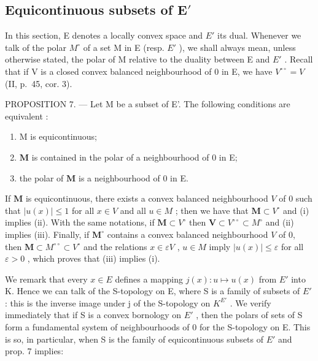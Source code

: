 \subsection{\texorpdfstring{Equicontinuous subsets of \(\mathbf{E}'\)}{Equicontinuous subsets of \textbackslash mathbf\{E\}\textquotesingle{}}}

In this section, E denotes a locally convex space and \(E'\) its dual. Whenever we talk of the polar \(M^{\circ}\) of a set M in E (resp. \(E'\) ), we shall always mean, unless otherwise stated, the polar of M relative to the duality between E and \(E'\) . Recall that if V is a closed convex balanced neighbourhood of 0 in E, we have \(V^{\circ\circ}=V\) (II, p.~45, cor. 3).

PROPOSITION 7. --- Let M be a subset of E'. The following conditions are equivalent :

\begin{enumerate}
\def\labelenumi{(\roman{enumi})}
\item
  M is equicontinuous;
\item
  \(\mathbf{M}\) is contained in the polar of a neighbourhood of 0 in E;
\item
  the polar of \(\mathbf{M}\) is a neighbourhood of 0 in E.
\end{enumerate}

If \(\mathbf{M}\) is equicontinuous, there exists a convex balanced neighbourhood \(V\) of 0 such that \(|u(x)| \leqslant 1\) for all \(x \in V\) and all \(u \in M\) ; then we have that \(\mathbf{M} \subset V^{\circ}\) and (i) implies (ii). With the same notations, if \(\mathbf{M} \subset V^{\circ}\) then \(\mathbf{V} \subset V^{\circ \circ} \subset M^{\circ}\) and (ii) implies (iii). Finally, if \(\mathbf{M}^{\circ}\) contains a convex balanced neighbourhood \(V\) of 0, then \(\mathbf{M} \subset M^{\circ \circ} \subset V^{\circ}\) and the relations \(x \in \varepsilon V\) , \(u \in M\) imply \(|u(x)| \leqslant \varepsilon\) for all \(\varepsilon > 0\) , which proves that (iii) implies (i).

We remark that every \(x \in E\) defines a mapping \(j(x): u \mapsto u(x)\) from \(E'\) into K. Hence we can talk of the S-topology on E, where S is a family of subsets of \(E'\) : this is the inverse image under j of the S-topology on \(K^{E'}\) . We verify immediately that if S is a convex bornology on \(E'\) , then the polars of sets of S form a fundamental system of neighbourhoods of 0 for the S-topology on E. This is so, in particular, when S is the family of equicontinuous subsets of \(E'\) and prop. 7 implies:

